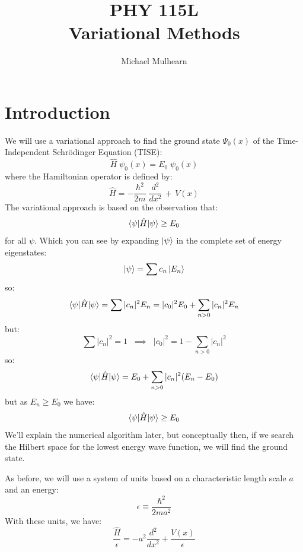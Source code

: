 \documentclass[12pt]{article}
\begin{document}
\newcommand{\ihbar}{\ensuremath{i \hbar}}
\newcommand{\Pss}{\ensuremath{\Psi^*}}
\newcommand{\dPsidt}{\ensuremath{ \frac{\partial \Psi}{\partial t} }}
\newcommand{\dPsidx}{\ensuremath{ \frac{\partial \Psi}{\partial x} }}
\newcommand{\ddPsidx}{\ensuremath{ \frac{\partial^2 \Psi}{\partial x^2} }}
\newcommand{\dPssdt}{\ensuremath{ \frac{\partial \Psi^*}{\partial t} }}
\newcommand{\dPssdx}{\ensuremath{ \frac{\partial \Psi^*}{\partial x} }}
\newcommand{\ddPssdx}{\ensuremath{ \frac{\partial^2 \Psi^*}{\partial x^2} }}

\newcommand{\dphidt}{\ensuremath{ \frac{d \phi}{dt} }}
\newcommand{\dpsidx}{\ensuremath{ \frac{d \psi}{dx} }}
\newcommand{\ddpsidx}{\ensuremath{ \frac{d^2 \psi}{dx^2} }}


\title{PHY 115L \\ Variational Methods}
\author{Michael Mulhearn}

\maketitle

\section{Introduction}

We will use a variational approach to find the ground state
$\Psi_0(x)$ of the Time-Independent Schr\"odinger Equation (TISE):
$$\hat{H} \; \psi_0(x) = E_0 \; \psi_0(x)$$
where the Hamiltonian operator is defined by:
\begin{equation}
\hat{H} = -\frac{\hbar^2}{2 m} \; \frac{d^2}{dx^2} \, + \, V(x)
\end{equation}
The variational approach is based on the observation that:
$$\braket{\psi|\hat{H}|\psi} \geq E_0$$
for all $\psi$.  Which you can see by expanding $\ket{\psi}$ in the complete set of energy eigenstates:
$$\ket{\psi} = \sum c_n \ket{E_n}$$
so:
$$\braket{\psi|\hat{H}|\psi} = \sum |c_n|^2 E_n = |c_0|^2 E_0 + \sum_{n>0} |c_n|^2 E_n$$
but:
$$\sum |c_n|^2 = 1 \;\; \implies \;\; |c_0|^2 = 1 - \sum_{n>0} |c_n|^2$$
so:
$$\braket{\psi|\hat{H}|\psi} = E_0 + \sum_{n>0} |c_n|^2 (E_n - E_0)$$
but as $E_n \geq E_0$ we have:
$$\braket{\psi|\hat{H}|\psi} \geq E_0$$
We'll explain the numerical algorithm later, but conceptually then, if
we search the Hilbert space for the lowest energy wave function, we
will find the ground state.

As before, we will use a system of units based on a characteristic length scale $a$ and an energy:
\begin{equation}
\epsilon \equiv \frac{\hbar^2}{2ma^2}
\end{equation}
With these units, we have:
\begin{equation}
\frac{\hat{H}}{\epsilon} = -a^2\frac{d^2}{dx^2} + \frac{V(x)}{\epsilon}
\end{equation}
\end{document}
